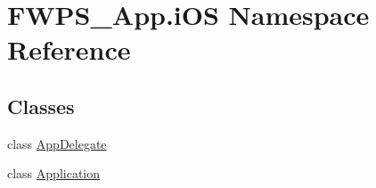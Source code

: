 \hypertarget{namespace_f_w_p_s___app_1_1i_o_s}{}\section{F\+W\+P\+S\+\_\+\+App.\+i\+OS Namespace Reference}
\label{namespace_f_w_p_s___app_1_1i_o_s}
\subsection*{Classes}
\begin{DoxyCompactItemize}
\item 
class \mbox{\hyperlink{class_f_w_p_s___app_1_1i_o_s_1_1_app_delegate}{App\+Delegate}}
\item 
class \mbox{\hyperlink{class_f_w_p_s___app_1_1i_o_s_1_1_application}{Application}}
\end{DoxyCompactItemize}

